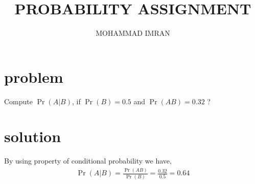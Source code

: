 \documentclass[journal,12pt,twocolumn]{article}
\title{PROBABILITY ASSIGNMENT}
\author{MOHAMMAD IMRAN}
\begin{document}
\maketitle
\bigskip

\section{problem }

Compute $\Pr{(A | B)}$, if $\Pr{(B)}=0.5$ and $\Pr{(AB)}=0.32$ ?

\section{solution }

By using property of conditional probability we have,
\begin{align}
\Pr{(A | B)}=\frac{\Pr{(AB)}}{\Pr{(B)}}=\frac{0.32}{0.5}=0.64
\end{align}
 
\end{document}
